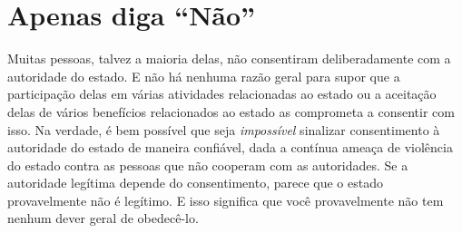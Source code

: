 \section{Apenas diga ``Não''}

Muitas pessoas, talvez a maioria delas, não consentiram deliberadamente com a autoridade do estado. E não há nenhuma razão geral para supor que a participação delas em várias atividades relacionadas ao estado ou a aceitação delas de vários benefícios relacionados ao estado as comprometa a consentir com isso. Na verdade, é bem possível que seja \emph{impossível} sinalizar consentimento à autoridade do estado de maneira confiável, dada a contínua ameaça de violência do estado contra as pessoas que não cooperam com as autoridades. Se a autoridade legítima depende do consentimento, parece que o estado provavelmente não é legítimo. E isso significa que você provavelmente não tem nenhum dever geral de obedecê-lo.